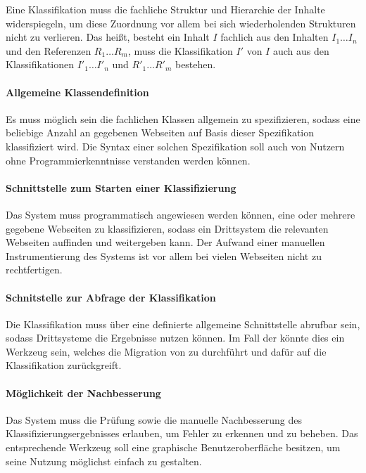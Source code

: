         Eine Klassifikation muss die fachliche Struktur
        und Hierarchie der Inhalte widerspiegeln,
        um diese Zuordnung vor allem bei sich wiederholenden Strukturen
        nicht zu verlieren.
        Das heißt, besteht ein Inhalt $I$ fachlich aus den Inhalten $I_1 \ldots I_n$
        und den Referenzen $R_1 \ldots R_m$,
        muss die Klassifikation $I'$ von $I$ auch aus den Klassifikationen
        $I'_1 \ldots I'_n$ und $R'_1 \ldots R'_m$ bestehen.

        \paragraph*{Allgemeine Klassendefinition}
        Es muss möglich sein die fachlichen Klassen allgemein zu
        spezifizieren, sodass eine beliebige Anzahl an gegebenen
        Webseiten auf Basis dieser Spezifikation klassifiziert wird.
        Die Syntax einer solchen Spezifikation soll auch von Nutzern ohne
        Programmierkenntnisse verstanden werden können.

        \paragraph*{Schnittstelle zum Starten einer Klassifizierung}      
        Das System muss programmatisch angewiesen werden können,
        eine oder mehrere gegebene Webseiten zu klassifizieren,
        sodass ein Drittsystem die relevanten Webseiten auffinden
        und weitergeben kann.
        Der Aufwand einer manuellen Instrumentierung des Systems ist
        vor allem bei vielen Webseiten nicht zu rechtfertigen.

        \paragraph*{Schnitstelle zur Abfrage der Klassifikation}
        Die Klassifikation muss über eine definierte allgemeine
        Schnittstelle abrufbar sein, sodass Drittsysteme die Ergebnisse
        nutzen können.
        Im Fall der {\fernUni} könnte dies ein Werkzeug sein,
        welches die Migration von {\wordpress} zu {\imperia}
        durchführt und dafür auf die Klassifikation zurückgreift.

        \paragraph*{Möglichkeit der Nachbesserung}
        Das System muss die Prüfung sowie die manuelle Nachbesserung
        des Klassifizierungsergebnisses erlauben,
        um Fehler zu erkennen und zu beheben.
        Das entsprechende Werkzeug soll eine graphische Benutzeroberfläche
        besitzen, um seine Nutzung möglichst einfach zu gestalten.

